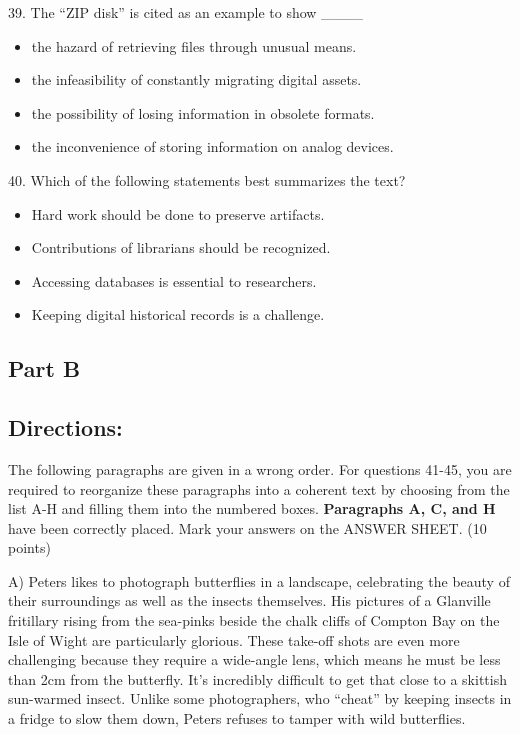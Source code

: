 \documentclass[UTF8,11pt]{ctexart}
\begin{document}
39. The “ZIP disk” is cited as an example to show \_\_\_\_


\begin{itemize}[leftmargin=2em,itemsep=.2em,topsep=.4em]\item[A.] the hazard of retrieving files through unusual means.
\item[B.] the infeasibility of constantly migrating digital assets.
\item[C.] the possibility of losing information in obsolete formats.
\item[D.] the inconvenience of storing information on analog devices.
\end{itemize}

40. Which of the following statements best summarizes the text?


\begin{itemize}[leftmargin=2em,itemsep=.2em,topsep=.4em]\item[A.] Hard work should be done to preserve artifacts.
\item[B.] Contributions of librarians should be recognized.
\item[C.] Accessing databases is essential to researchers.
\item[D.] Keeping digital historical records is a challenge.
\end{itemize}

\subsection*{\textbf{Part B}}


\subsection*{\textbf{Directions:}}


The following paragraphs are given in a wrong order. For questions 41-45, you are required to reorganize these paragraphs into a coherent text by choosing from the list A-H and filling them into the numbered boxes. \textbf{Paragraphs A, C, and H} have been correctly placed. Mark your answers on the ANSWER SHEET. (10 points)


A) Peters likes to photograph butterflies in a landscape, celebrating the beauty of their surroundings as well as the insects themselves. His pictures of a Glanville fritillary rising from the sea-pinks beside the chalk cliffs of Compton Bay on the Isle of Wight are particularly glorious. These take-off shots are even more challenging because they require a wide-angle lens, which means he must be less than 2cm from the butterfly. It’s incredibly difficult to get that close to a skittish sun-warmed insect. Unlike some photographers, who “cheat” by keeping insects in a fridge to slow them down, Peters refuses to tamper with wild butterflies.
\end{document}
